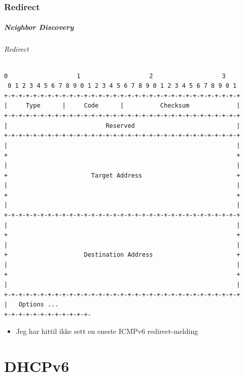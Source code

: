 \section{Redirect}
\begin{frame}[fragile]%
  \frametitle{Neighbor Discovery}
  \framesubtitle{Redirect}
  \pause
\begin{Verbatim}[fontsize=\tiny]
 0                   1                   2                   3
 0 1 2 3 4 5 6 7 8 9 0 1 2 3 4 5 6 7 8 9 0 1 2 3 4 5 6 7 8 9 0 1
+-+-+-+-+-+-+-+-+-+-+-+-+-+-+-+-+-+-+-+-+-+-+-+-+-+-+-+-+-+-+-+-+
|     Type      |     Code      |          Checksum             |
+-+-+-+-+-+-+-+-+-+-+-+-+-+-+-+-+-+-+-+-+-+-+-+-+-+-+-+-+-+-+-+-+
|                           Reserved                            |
+-+-+-+-+-+-+-+-+-+-+-+-+-+-+-+-+-+-+-+-+-+-+-+-+-+-+-+-+-+-+-+-+
|                                                               |
+                                                               +
|                                                               |
+                       Target Address                          +
|                                                               |
+                                                               +
|                                                               |
+-+-+-+-+-+-+-+-+-+-+-+-+-+-+-+-+-+-+-+-+-+-+-+-+-+-+-+-+-+-+-+-+
|                                                               |
+                                                               +
|                                                               |
+                     Destination Address                       +
|                                                               |
+                                                               +
|                                                               |
+-+-+-+-+-+-+-+-+-+-+-+-+-+-+-+-+-+-+-+-+-+-+-+-+-+-+-+-+-+-+-+-+
|   Options ...
+-+-+-+-+-+-+-+-+-+-+-+-
\end{Verbatim}
  \pause
  \begin{itemize}[<+->]
  \item Jeg har hittil ikke sett en eneste ICMPv6 redirect-melding
  \end{itemize}
\end{frame}

\part{DHCPv6}

\begin{frame}
  \partpage
\end{frame}

